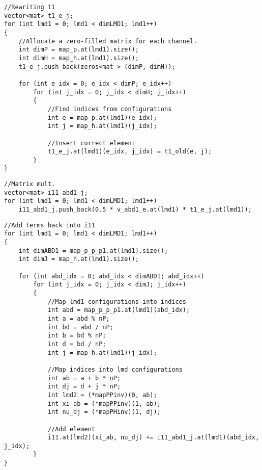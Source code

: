\begin{lstlisting}[float,label={lst:CC:i11_2_1_t1},caption={Mapping from $\langle e | t_1 | j \rangle$ into $\langle e |t_1|j\rangle_{\lambda_{1p}}$, required at each iteration.}]
//Rewriting t1
vector<mat> t1_e_j;
for (int lmd1 = 0; lmd1 < dimLMD1; lmd1++)
{
	//Allocate a zero-filled matrix for each channel.
	int dimP = map_p.at(lmd1).size();
    int dimH = map_h.at(lmd1).size();
    t1_e_j.push_back(zeros<mat > (dimP, dimH));

	for (int e_idx = 0; e_idx < dimP; e_idx++)
    	for (int j_idx = 0; j_idx < dimH; j_idx++)
        {
        	//Find indices from configurations
        	int e = map_p.at(lmd1)(e_idx);
            int j = map_h.at(lmd1)(j_idx);

			//Insert correct element
            t1_e_j.at(lmd1)(e_idx, j_idx) = t1_old(e, j);
		}
}	
\end{lstlisting}
\begin{lstlisting}[float,label={lst:CC:i11_2_2},caption={Multiply each diagonal block.}]
//Matrix mult.
vector<mat> i11_abd1_j;
for (int lmd1 = 0; lmd1 < dimLMD1; lmd1++)
	i11_abd1_j.push_back(0.5 * v_abd1_e.at(lmd1) * t1_e_j.at(lmd1));
\end{lstlisting}
\begin{lstlisting}[float,label={lst:CC:i11_2_3},caption={Terms are added back into $\mathcal{I}_{11}$.}]
//Add terms back into i11
for (int lmd1 = 0; lmd1 < dimLMD1; lmd1++)
{
	int dimABD1 = map_p_p_p1.at(lmd1).size();
    int dimJ = map_h.at(lmd1).size();

    for (int abd_idx = 0; abd_idx < dimABD1; abd_idx++)
    	for (int j_idx = 0; j_idx < dimJ; j_idx++)
        {
        	//Map lmd1 configurations into indices
        	int abd = map_p_p_p1.at(lmd1)(abd_idx);
            int a = abd % nP;
            int bd = abd / nP;
            int b = bd % nP;
            int d = bd / nP;
            int j = map_h.at(lmd1)(j_idx);

			//Map indices into lmd configurations
            int ab = a + b * nP;
            int dj = d + j * nP;
            int lmd2 = (*mapPPinv)(0, ab);
            int xi_ab = (*mapPPinv)(1, ab);
            int nu_dj = (*mapPHinv)(1, dj);

			//Add element
			i11.at(lmd2)(xi_ab, nu_dj) += i11_abd1_j.at(lmd1)(abd_idx, j_idx);
		}
}
\end{lstlisting}





